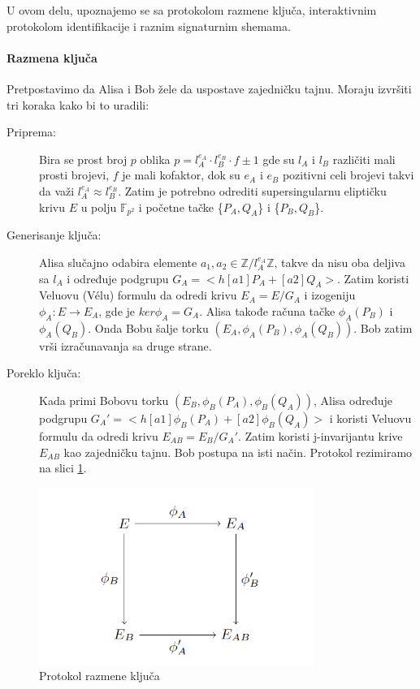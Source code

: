 \documentclass[a4paper]{article}
\begin{document}
U ovom delu, upoznajemo se sa protokolom razmene ključa, interaktivnim protokolom identifikacije i raznim signaturnim shemama. 

\paragraph{Razmena ključa} Pretpostavimo da Alisa i Bob žele da uspostave zajedničku tajnu. Moraju izvršiti tri koraka kako bi to uradili:

\begin{description}
	\item[Priprema:] Bira se prost broj $p$ oblika $p = l^{e_A}_{A} \cdot l^{e_B}_{B} \cdot f \pm 1$ gde su $l_{A}$ i  $l_{B}$ različiti mali prosti brojevi, $f$ je mali kofaktor, dok su $e_A$ i $e_B$ pozitivni celi brojevi takvi da važi $l^{e_A}_{A} \approx l^{e_B}_{B}$. Zatim je potrebno odrediti supersingularnu eliptičku krivu $E$ u polju $\mathbb{F}_{p^2}$ i početne tačke \{$P_A, Q_A$\} i \{$P_B, Q_B$\}. 
	
	
	\item[Generisanje ključa:] Alisa slučajno odabira elemente $a_1, a_2 \in \mathbb{Z}/l^{e_A}_{A}\mathbb{Z}$, takve da nisu oba deljiva sa $l_A$ i određuje podgrupu $G_A = <h[a1]P_A + [a2]Q_A>$. Zatim koristi Veluovu (V\' elu) formulu da odredi krivu $E_A = E/G_A$ i izogeniju $\phi_A: E \longrightarrow E_A$, gde je $ker \phi_A = G_A$. Alisa takođe računa tačke $\phi_A(P_B)$ i $\phi_A(Q_B)$. Onda Bobu šalje torku $(E_A, \phi_A(P_B), \phi_A(Q_B))$. Bob  zatim vrši izračunavanja sa druge strane.
	
	\item[Poreklo ključa:] Kada primi Bobovu torku $(E_B, \phi_B(P_A), \phi_B(Q_A))$, Alisa određuje podgrupu $G_A' = <h[a1]\phi_B(P_A) + [a2]\phi_B(Q_A)>$ i koristi Veluovu formulu da odredi krivu $E_{AB} = E_B / G_A'$. Zatim koristi j-invarijantu krive $E_{AB}$ kao zajedničku tajnu. Bob postupa na isti način. Protokol rezimiramo na slici \ref{fig: razmena kljuca}.
	
\end{description}


\begin{figure}[h]
	\centering
	\includegraphics[width=0.8\textwidth]{razmena_kljuca.png}
	\caption{Protokol razmene ključa}
	\label{fig: razmena kljuca}
\end{figure}
\end{document}
